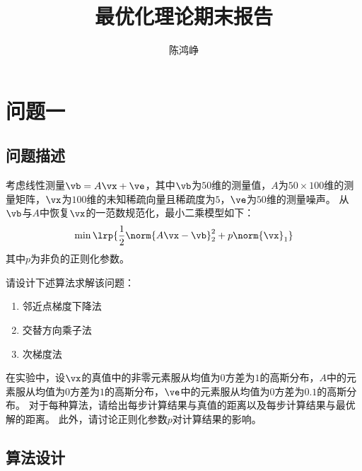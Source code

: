 \documentclass[logo,reportComp]{thesis}
\title{最优化理论期末报告}
\subtitle{}
\author{陈鸿峥}
\begin{document}
\maketitle

\section{问题一}
\subsection{问题描述}
考虑线性测量$\vb=A\vx+\ve$，其中$\vb$为$50$维的测量值，$A$为$50\times 100$维的测量矩阵，$\vx$为$100$维的未知稀疏向量且稀疏度为$5$，$\ve$为$50$维的测量噪声。
从$\vb$与$A$中恢复$\vx$的一范数规范化，最小二乘模型如下：
\[\min\lrp{\frac{1}{2}\norm{A\vx-\vb}_2^2+p\norm{\vx}_1}\]
其中$p$为非负的正则化参数。

请设计下述算法求解该问题：
\begin{enumerate}
    \item 邻近点梯度下降法
    \item 交替方向乘子法
    \item 次梯度法
\end{enumerate}

在实验中，设$\vx$的真值中的非零元素服从均值为$0$方差为$1$的高斯分布，$A$中的元素服从均值为$0$方差为$1$的高斯分布，$\ve$中的元素服从均值为$0$方差为$0.1$的高斯分布。
对于每种算法，请给出每步计算结果与真值的距离以及每步计算结果与最优解的距离。
此外，请讨论正则化参数$p$对计算结果的影响。

\subsection{算法设计}
\end{document}
